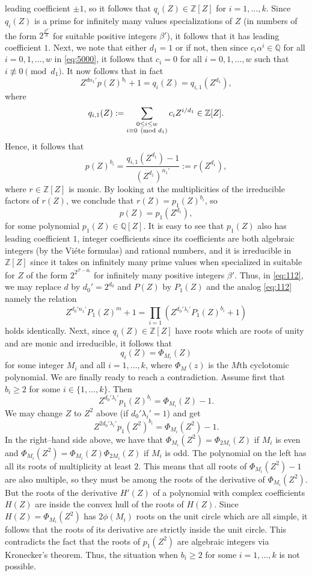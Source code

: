 \documentclass[11pt]{article}
\def\\{\cr}
\begin{document}
leading coefficient $\pm 1$, so it follows that $q_i(Z)\in {\mathbb Z}[Z]$ for $i=1,\ldots,k$. Since $q_i(Z)$ is a prime for infinitely many values specializations of $Z$ (in numbers of the form $2^{\frac{2^{\beta'}}{d}}$ for suitable positive integers $\beta'$), it follows that it has leading coefficient $1$. 
Next, we note that either $d_1=1$ or if not, then since $c_i\alpha^{i}\in {\mathbb Q}$ for all $i=0,1,\ldots,w$ in \eqref{eq:5000}, it follows that $c_i=0$ for all $i=0,1,\ldots,w$ such that
$i\not\equiv 0\pmod {d_1}$. It now follows that in fact 
$$
Z^{dn_1'} p(Z)^{b_i}+1=q_i(Z)=q_{i,1}(Z^{d_1}),
$$
where 
$$
q_{i,1}(Z):=\sum_{\substack{0\le i\le w\\ i\equiv 0\pmod {d_1}}} c_{i}Z^{i/d_1}\in {\mathbb Z}[Z]. 
$$
Hence, it follows that 
$$
p(Z)^{b_i}=\frac{q_{i,1}(Z^{d_1})-1}{(Z^{d_1})^{n_1'}}:=r(Z^{d_1}),
$$
where $r\in {\mathbb Z}[Z]$ is monic. By looking at the multiplicities of the irreducible factors of $r(Z)$, we conclude that $r(Z)=p_1(Z)^{b_i}$, so 
$$
p(Z)=p_1(Z^{d_1}),
$$
for some polynomial $p_1(Z)\in {\mathbb Q}[Z]$. It is easy to see that $p_1(Z)$ also has leading coefficient $1$, integer coefficients since its coefficients are both 
algebraic integers (by the Vi\'ete formulas) and rational numbers, and it is irreducible in ${\mathbb Z}[Z]$ since it takes on infinitely many prime values when specialized  in suitable for $Z$ of the form $2^{2^{\beta'-d_0}}$ for infinitely many positive integers 
$\beta'$.  Thus, in \eqref{eq:112}, we may replace $d$ by $d_0'=2^{d_0}$ and $P(Z)$ by $P_1(Z)$ and the analog \eqref{eq:112} namely the relation
$$
Z^{d_0'n_1'}P_1(Z)^m+1=\prod_{i=1}(Z^{d_0'\lambda_i'} P_1(Z)^{b_i}+1)
$$
holds identically. Next, since $q_i(Z)\in {\mathbb Z}[Z]$ have roots which are roots of unity and are monic and irreducible, it follows  that
$$
q_i(Z)=\Phi_{M_i}(Z)
$$
for some integer ${M_i}$ and all $i=1,\ldots,k$, where $\Phi_{M}(z)$ is the $M$th cyclotomic polynomial. We are finally ready to reach a contradiction. Assume first that $b_i\ge 2$ for some $i\in \{1,\ldots,k\}$. Then 
$$
Z^{d_0'\lambda_i'}p_1(Z)^{b_i}=\Phi_{M_i}(Z)-1.
$$
We may change $Z$ to $Z^2$ above (if $d_0'\lambda_i'=1$) and get 
$$
Z^{2d_0'\lambda_i'}p_1(Z^2)^{b_i}=\Phi_{M_i}(Z^2)-1.
$$
In the right--hand side above, we have that $\Phi_{M_i}(Z^2)=\Phi_{2M_i}(Z)$ if $M_i$ is even and $\Phi_{M_i}(Z^2)=\Phi_{M_i}(Z)\Phi_{2M_i}(Z)$ if $M_i$ is odd. The polynomial on the left has all its roots of multiplicity at least $2$. 
This means that all roots of $\Phi_{M_i}(Z^2)-1$ are also multiple, so they must be among the roots of the derivative of $\Phi_{M_i}(Z^2)$. But the roots of the derivative $H'(Z)$ of a polynomial with complex coefficients $H(Z)$ are 
inside the convex hull of the roots of $H(Z)$. Since $H(Z)=\Phi_{M_i}(Z^2)$ has   $2\phi(M_i)$ roots on the unit circle which are all simple, it follows that the roots of its derivative are strictly inside the unit circle. 
This contradicts the fact that the roots of $p_1(Z^2)$ are algebraic integers via Kronecker's theorem. Thus, the situation when $b_i\ge 2$ for some $i=1,\ldots,k$ is not possible. 
\end{document}
